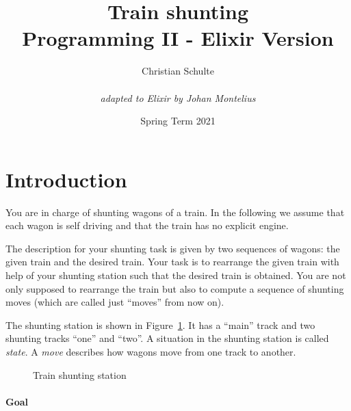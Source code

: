 \documentclass[a4paper,11pt]{article}
\begin{document}
\title{
    \textbf{Train shunting}\\
    \large{Programming II - Elixir Version}
}
\author{Christian Schulte \\ \\ {\em adapted to Elixir by Johan Montelius}}
\date{Spring Term 2021}
\maketitle


\thispagestyle{fancy}

\section{Introduction}

You are in charge of shunting wagons of a train.  In
the following we assume that each wagon is self driving and that the
train has no explicit engine.

The description for your shunting task is given by two sequences of
wagons: the given train and the desired train. Your task is to
rearrange the given train with help of your shunting station such that
the desired train is obtained. You are not only supposed to rearrange
the train but also to compute a sequence of shunting moves (which are
called just ``moves'' from now on).


The shunting station is shown in Figure~\ref{fig:station}. It has a
``main'' track and two shunting tracks ``one'' and ``two''.  A
situation in the shunting station is called \emph{state}. A
\emph{move} describes how wagons move from one track to another.

\begin{figure}[h]
\begin{center}
\end{center}  
\caption{Train shunting station}
\label{fig:station}
\end{figure}

\paragraph{Goal}
\end{document}
